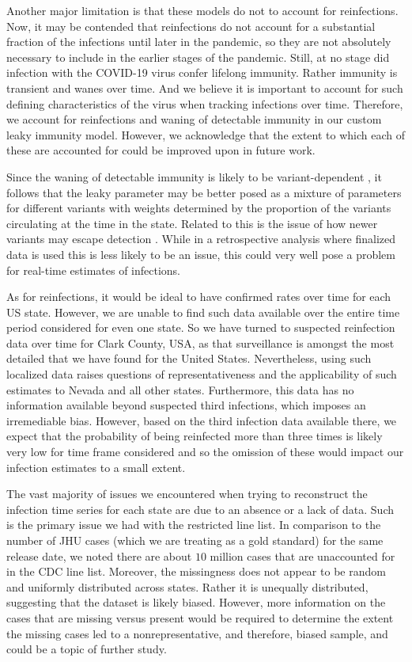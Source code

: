 \documentclass{article}
\begin{document}
Another major limitation is that these models do not to account for
reinfections. Now, it may be contended that reinfections do not account for a
substantial fraction of the infections until later in the pandemic, so they are
not absolutely necessary to include in the earlier stages of the pandemic.
Still, at no stage did infection with the COVID-19 virus confer lifelong
immunity. Rather immunity is transient and wanes over time. And we believe it is
important to account for such defining characteristics of the virus when
tracking infections over time. Therefore, we account for reinfections and waning
of detectable immunity in our custom leaky immunity model. However, we 
acknowledge that the extent to which each of these are accounted for could be
improved upon in future work. 

Since the waning of detectable immunity is likely to be variant-dependent
\citep{pooley2023durability}, it follows that the leaky parameter may be better
posed as a mixture of parameters for different variants with weights determined
by the proportion of the variants circulating at the time in the state. Related
to this is the issue of how newer variants may escape detection
\citep{nih2022assessing, fda2023sars}. While in a retrospective analysis where
finalized data is used this is less likely to be an issue, this could very well
pose a problem for real-time estimates of infections.

As for reinfections, it would be ideal to have confirmed rates
over time for each US state. However, we are unable to find such data available
over the entire time period considered for even one state. So we have turned to
suspected reinfection data over time for Clark County, USA, as that surveillance
is amongst the most detailed that we have found for the United States.
Nevertheless, using such localized data raises questions of representativeness
and the applicability of such estimates to Nevada and all other states.
Furthermore, this data has no information available beyond suspected third
infections, which imposes an irremediable bias. However, based on the third
infection data available there, we expect that the probability of being
reinfected more than three times is likely very low for time frame considered
and so the omission of these would impact our infection estimates to a small
extent. 

The vast majority of issues we encountered when trying to reconstruct the
infection time series for each state are due to an absence or a lack of data.
Such is the primary issue we had with the restricted line list. In comparison to
the number of JHU cases (which we are treating as a gold standard) for the same
release date, we noted there are about $10$ million cases that are unaccounted
for in the CDC line list. Moreover, the missingness does not appear to be random
and uniformly distributed across states. Rather it is unequally distributed,
suggesting that the dataset is likely biased. However, more information on the
cases that are missing versus present would be required to determine the extent
the missing cases led to a nonrepresentative, and therefore, biased sample, and
could be a topic of further study.
\end{document}
